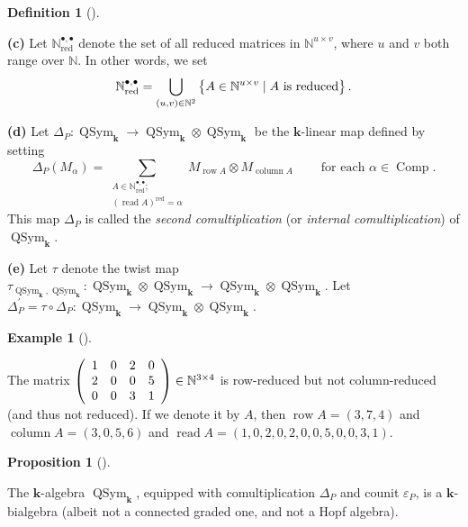 \documentclass[numbers=enddot,12pt,final,onecolumn,notitlepage,abstracton]{scrartcl}%
\theoremstyle{definition}
\newtheorem{prop}[theo]{Proposition}
\newenvironment{proposition}[1][]
{\begin{prop}[#1]\begin{leftbar}}
{\end{leftbar}\end{prop}}
\newtheorem{defi}[theo]{Definition}
\newenvironment{definition}[1][]
{\begin{defi}[#1]\begin{leftbar}}
{\end{leftbar}\end{defi}}
\newtheorem{exam}[theo]{Example}
\newenvironment{example}[1][]
{\begin{exam}[#1]\begin{leftbar}}
{\end{leftbar}\end{exam}}
\let\sumnonlimits\sum
\let\cupnonlimits\bigcup
\renewcommand{\sum}{\sumnonlimits\limits}
\renewcommand{\bigcup}{\cupnonlimits\limits}
\begin{document}
\begin{definition}
\textbf{(c)} Let $\mathbb{N}_{\operatorname*{red}}^{\bullet,\bullet}$ denote
the set of all reduced matrices in $\mathbb{N}^{u\times v}$, where $u$ and $v$
both range over $\mathbb{N}$. In other words, we set
\[
\mathbb{N}_{\operatorname{red}}^{\bullet, \bullet} = \bigcup\limits_{\left(
u, v\right)  \in\mathbb{N}^{2}} \left\{  A \in\mathbb{N}^{u \times v} \mid A
\text{ is reduced} \right\}  .
\]


\textbf{(d)} Let $\Delta_{P}:\operatorname*{QSym}\nolimits_{\mathbf{k}%
}\rightarrow\operatorname*{QSym}\nolimits_{\mathbf{k}}\otimes
\operatorname*{QSym}\nolimits_{\mathbf{k}}$ be the $\mathbf{k}$-linear map
defined by setting%
\[
\Delta_{P}\left(  M_{\alpha}\right)  =\sum_{\substack{A\in\mathbb{N}%
_{\operatorname*{red}}^{\bullet,\bullet};\\\left(  \operatorname*{read}%
A\right)  ^{\operatorname*{red}}=\alpha}}M_{\operatorname*{row}A}\otimes
M_{\operatorname*{column}A}\ \ \ \ \ \ \ \ \ \ \text{for each }\alpha
\in\operatorname*{Comp}.
\]
This map $\Delta_{P}$ is called the \textit{second comultiplication} (or
\textit{internal comultiplication}) of $\operatorname*{QSym}%
\nolimits_{\mathbf{k}}$.

\textbf{(e)} Let $\tau$ denote the twist map $\tau_{\operatorname*{QSym}%
\nolimits_{\mathbf{k}},\operatorname*{QSym}\nolimits_{\mathbf{k}}%
}:\operatorname*{QSym}\nolimits_{\mathbf{k}}\otimes\operatorname*{QSym}%
\nolimits_{\mathbf{k}}\rightarrow\operatorname*{QSym}\nolimits_{\mathbf{k}%
}\otimes\operatorname*{QSym}\nolimits_{\mathbf{k}}$. Let $\Delta_{P}^{\prime
}=\tau\circ\Delta_{P}:\operatorname*{QSym}\nolimits_{\mathbf{k}}%
\rightarrow\operatorname*{QSym}\nolimits_{\mathbf{k}}\otimes
\operatorname*{QSym}\nolimits_{\mathbf{k}}$.
\end{definition}

\begin{example}
The matrix $\left(
\begin{array}
[c]{cccc}%
1 & 0 & 2 & 0\\
2 & 0 & 0 & 5\\
0 & 0 & 3 & 1
\end{array}
\right)  \in\mathbb{N}^{3\times4}$ is row-reduced but not column-reduced (and
thus not reduced). If we denote it by $A$, then $\operatorname*{row}A=\left(
3,7,4\right)  $ and $\operatorname*{column}A=\left(  3,0,5,6\right)  $ and
$\operatorname*{read}A=\left(  1,0,2,0,2,0,0,5,0,0,3,1\right)  $.
\end{example}

\begin{proposition}
\label{prop.QSym.secondbialg}The $\mathbf{k}$-algebra $\operatorname*{QSym}%
\nolimits_{\mathbf{k}}$, equipped with comultiplication $\Delta_{P}$ and
counit $\varepsilon_{P}$, is a $\mathbf{k}$-bialgebra (albeit not a connected
graded one, and not a Hopf algebra).
\end{proposition}
\end{document}
